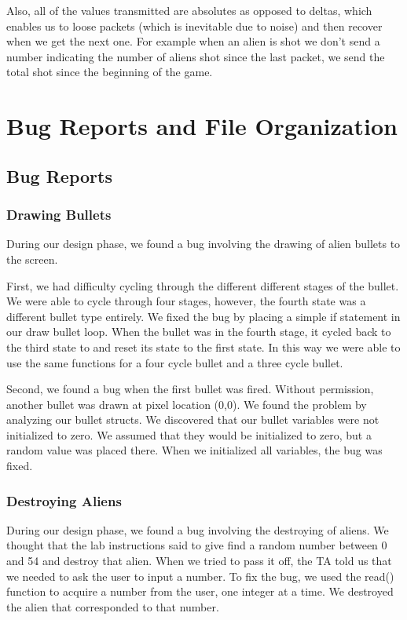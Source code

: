 \documentclass[11pt,letter,oneside]{report}
\begin{document}
Also, all of the values transmitted are absolutes as opposed to deltas, which enables us to loose packets (which is inevitable due to noise) and then recover when we get the next one.  For example when an alien is shot we don't send a number indicating the number of aliens shot since the last packet, we send the total shot since the beginning of the game.  




\chapter{Bug Reports and File Organization}

\section{Bug Reports}

\subsection{Drawing Bullets}
During our design phase, we found a bug involving the drawing of alien bullets to the screen. 

First, we had difficulty cycling through the different different stages of the bullet. We were able to cycle through four stages, however, the fourth state was a different bullet type entirely. We fixed the bug by placing a simple if statement in our draw bullet loop. When the bullet was in the fourth stage, it cycled back to the third state to and reset its state to the first state. In this way we were able to use the same functions for a four cycle bullet and a three cycle bullet.

Second, we found a bug when the first bullet was fired. Without permission, another bullet was drawn at pixel location (0,0). We found the problem by analyzing our bullet structs. We discovered that our bullet variables were not initialized to zero. We assumed that they would be initialized to zero, but a random value was placed there. When we initialized all variables, the bug was fixed.

\subsection{Destroying Aliens}
During our design phase, we found a bug involving the destroying of aliens. We thought that the lab instructions said to give find a random number between 0 and 54 and destroy that alien. When we tried to pass it off, the TA told us that we needed to ask the user to input a number. To fix the bug, we used the read() function to acquire a number from the user, one integer at a time. We destroyed the alien that corresponded to that number.
\end{document}
